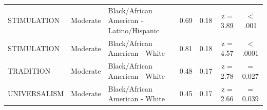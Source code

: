 \begin{table}[t]
\begin{tabular*}{\linewidth}{@{\extracolsep{\fill}}lllcccc}
STIMULATION & Moderate & Black/African American - Latino/Hispanic & 0.69 & 0.18 & z = 3.89 & < .001 \\ 
STIMULATION & Moderate & Black/African American - White & 0.81 & 0.18 & z = 4.57 & < .0001 \\ 
TRADITION & Moderate & Black/African American - White & 0.48 & 0.17 & z = 2.78 & = 0.027 \\ 
UNIVERSALISM & Moderate & Black/African American - White & 0.45 & 0.17 & z = 2.66 & = 0.039 \\ 
\bottomrule
\end{tabular*}
\end{table}

